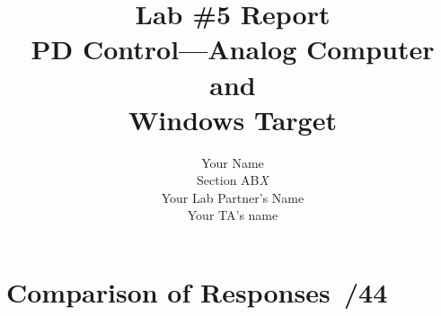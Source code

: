 \documentclass{article}
\newcommand{\score}{\hfill \underline{\hspace{0.65cm}}\,/} %
\begin{document}
%
\title{\bf Lab \#5 Report\\{\sc PD Control---Analog Computer and \\ Windows Target}}
\author{Your Name\\ Section AB\emph{X}\\
Your Lab Partner's Name\\
Your TA's name}
\maketitle

\noindent {}

\section{Comparison of Responses  \score 44}
\end{document}
